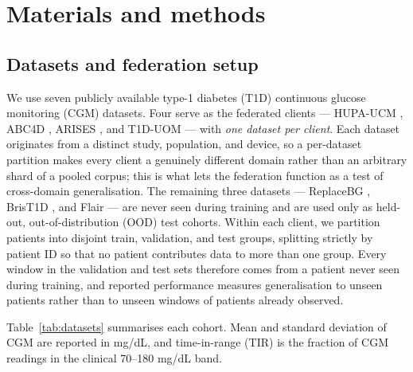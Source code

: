 \documentclass[10pt,letterpaper]{article}
\begin{document}
\section*{Materials and methods}

\subsection*{Datasets and federation setup}

We use seven publicly available type-1 diabetes (T1D) continuous glucose
monitoring (CGM) datasets. Four serve as the federated clients --- HUPA-UCM
\cite{hidalgo2024hupaucm}, ABC4D \cite{abc4d_nct}, ARISES \cite{zhu2022arises},
and T1D-UOM \cite{alsuhaymi2025t1duom} --- with \emph{one dataset per client}. Each dataset
originates from a distinct study, population, and device, so a per-dataset
partition makes every client a genuinely different domain rather than an
arbitrary shard of a pooled corpus; this is what lets the federation function as
a test of cross-domain generalisation. The remaining three datasets ---
ReplaceBG \cite{aleppo2017replacebg}, BrisT1D \cite{james2025brist1d}, and Flair
\cite{jaeb_flair} --- are never seen
during training and are used only as held-out, out-of-distribution (OOD) test
cohorts. Within
each client, we partition patients
into disjoint train, validation, and test groups, splitting strictly by
patient ID so that no patient contributes data to more than one group. Every
window in the validation and test sets therefore comes from a patient never
seen during training, and reported performance measures generalisation to
unseen patients rather than to unseen windows of patients already observed.

Table~\ref{tab:datasets} summarises each cohort. Mean and standard deviation of
CGM are reported in mg/dL, and time-in-range (TIR) is the fraction of CGM
readings in the clinical 70--180 mg/dL band.
\end{document}
